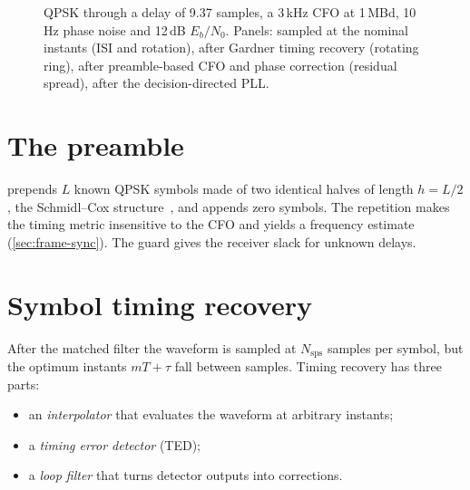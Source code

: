 \begin{figure}[htbp]
\centering
{}
\caption{QPSK through a delay of 9.37 samples, a 3\,kHz CFO at 1\,MBd, 10\,Hz phase noise and
12\,dB $E_b/N_0$. Panels: sampled at the nominal instants (ISI and rotation), after Gardner
timing recovery (rotating ring), after preamble-based CFO and phase correction (residual
spread), after the decision-directed PLL.}
\label{fig:sync-const}
\end{figure}

\section{The preamble}
 prepends $L$ known QPSK symbols made of two identical halves of length
$h=L/2$, the Schmidl--Cox structure~\cite{schmidl1997}, and appends  zero symbols.
The repetition makes the timing metric insensitive to the CFO and yields a frequency estimate
(\cref{sec:frame-sync}). The guard gives the receiver slack for unknown delays.

\section{Symbol timing recovery}
After the matched filter the waveform is sampled at $N_{\mathrm{sps}}$ samples per symbol, but
the optimum instants $mT+\tau$ fall between samples. Timing recovery has three parts:
\begin{itemize}
  \item an \emph{interpolator} that evaluates the waveform at arbitrary instants;
  \item a \emph{timing error detector} (TED);
  \item a \emph{loop filter} that turns detector outputs into corrections.
\end{itemize}

